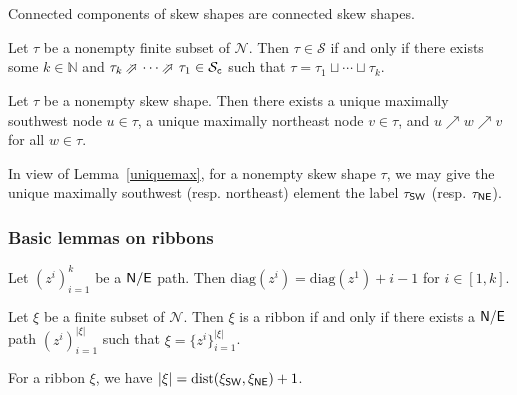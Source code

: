 \documentclass[Unicode,ALCO]{cedram}
\newcommand{\N}{\mathcal{N}}
\newcommand{\SSSS}{\mathcal{S}}
\newcommand{\0}{{\bar 0}}
\newcommand{\NEarrow}{\mathbin{\rotatebox[origin=c]{45}{$\Rightarrow$}}}
\newcommand{\diag}{{\mathrm {diag}}}
\newcommand{\dist}{{\mathrm {dist}}}
\newcommand{\NN}{{\mathbb N}}
\newcommand{\no}{{\sf N}}
\newcommand{\ea}{{\sf E}}
\newcommand{\nnee}{{\sf NE}}
\newcommand{\ssww}{{\sf SW}}
\begin{document}
\begin{lemma}\label{skewcomps}
Connected components of skew shapes are connected skew shapes.
\end{lemma}



\begin{lemma}\label{skewshapecondecomp}
Let \(\tau\) be a nonempty finite subset of \(\N\). Then \(\tau \in \SSSS\) if and only if there exists some \(k \in \NN\) and \(\tau_k \NEarrow \cdots \NEarrow \tau_1 \in \SSSS_{\tt c}\) such that \(\tau = \tau_1 \sqcup \cdots \sqcup \tau_k\).
\end{lemma}


\begin{lemma}\label{uniquemax}
Let \(\tau\) be a nonempty skew shape. Then there exists a unique maximally southwest node \(u \in \tau\), a unique maximally northeast node \(v \in \tau\), and \(u \nearrow w \nearrow v\) for all \(w \in \tau\).
\end{lemma}

In view of Lemma~\ref{uniquemax}, for a nonempty skew shape \(\tau\), we may give the unique maximally southwest (resp. northeast) element the label \(\tau_{\ssww}\) (resp. \(\tau_{\nnee}\)). 

\subsubsection{Basic lemmas on ribbons}

\begin{lemma}\label{dumbdiag}
Let \((z^i)_{i = 1}^k\) be a \(\no/\ea\) path. Then \(\diag(z^i) = \diag(z^1) + i -1\) for \(i \in [1,k]\).
\end{lemma}

\begin{lemma}\label{hookispath}
Let \(\xi\) be a finite subset of \(\N\). Then \(\xi\) is a ribbon if and only if there exists a \(\no/\ea\) path  \((z^i)_{i = 1}^{|\xi|}\) such that \(\xi = \{z^i\}_{i = 1}^{|\xi|}\).
\end{lemma}

\begin{lemma}\label{sizehook}
For a ribbon \(\xi\), we have \(|\xi| = \dist(\xi_{\ssww}, \xi_{\nnee})+1\).
\end{lemma}
\end{document}
